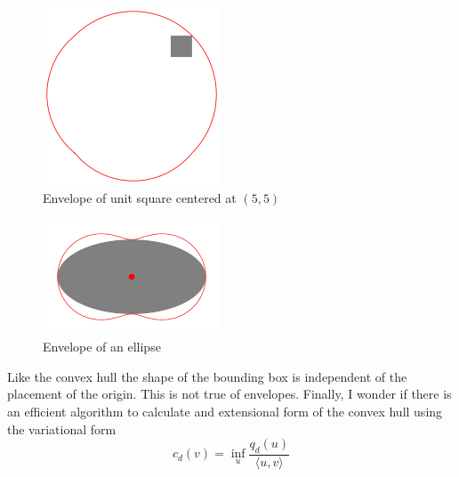 \documentclass[11pt]{amsart}
\begin{document}
\begin{figure}[h]
 \centering
\includegraphics[width=150pt]{sq1_11.png}
\caption{Envelope of unit square centered at $(5,5)$}
\end{figure}

\begin{figure}[h]
 \centering
\includegraphics[width=150pt]{c1_00.png}
\caption{Envelope of an ellipse}
\end{figure}

Like the convex hull the shape of the bounding box is independent of the placement of the origin. This is not true of envelopes.
Finally, I wonder if there is an efficient algorithm to calculate and extensional form of the convex hull using the variational form
$$c_d(v) = \inf_u  \frac{q_d(u)}{\langle u, v \rangle}$$
\end{document}
